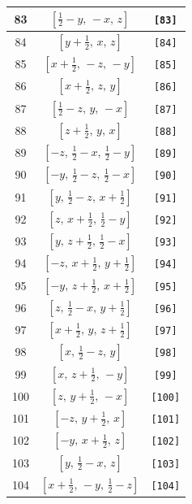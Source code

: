 \documentclass[fleqn,8pt]{jsarticle}
\begin{document}
\begin{longtable}{ccc}
83 & $\left[ \frac{1}{2} - y,\, - x,\, z \right]$ & {\tt [83]} \\ \hline
84 & $\left[ y + \frac{1}{2},\, x,\, z \right]$ & {\tt [84]} \\ \hline
85 & $\left[ x + \frac{1}{2},\, - z,\, - y \right]$ & {\tt [85]} \\ \hline
86 & $\left[ x + \frac{1}{2},\, z,\, y \right]$ & {\tt [86]} \\ \hline
87 & $\left[ \frac{1}{2} - z,\, y,\, - x \right]$ & {\tt [87]} \\ \hline
88 & $\left[ z + \frac{1}{2},\, y,\, x \right]$ & {\tt [88]} \\ \hline
89 & $\left[ - z,\, \frac{1}{2} - x,\, \frac{1}{2} - y \right]$ & {\tt [89]} \\ \hline
90 & $\left[ - y,\, \frac{1}{2} - z,\, \frac{1}{2} - x \right]$ & {\tt [90]} \\ \hline
91 & $\left[ y,\, \frac{1}{2} - z,\, x + \frac{1}{2} \right]$ & {\tt [91]} \\ \hline
92 & $\left[ z,\, x + \frac{1}{2},\, \frac{1}{2} - y \right]$ & {\tt [92]} \\ \hline
93 & $\left[ y,\, z + \frac{1}{2},\, \frac{1}{2} - x \right]$ & {\tt [93]} \\ \hline
94 & $\left[ - z,\, x + \frac{1}{2},\, y + \frac{1}{2} \right]$ & {\tt [94]} \\ \hline
95 & $\left[ - y,\, z + \frac{1}{2},\, x + \frac{1}{2} \right]$ & {\tt [95]} \\ \hline
96 & $\left[ z,\, \frac{1}{2} - x,\, y + \frac{1}{2} \right]$ & {\tt [96]} \\ \hline
97 & $\left[ x + \frac{1}{2},\, y,\, z + \frac{1}{2} \right]$ & {\tt [97]} \\ \hline
98 & $\left[ x,\, \frac{1}{2} - z,\, y \right]$ & {\tt [98]} \\ \hline
99 & $\left[ x,\, z + \frac{1}{2},\, - y \right]$ & {\tt [99]} \\ \hline
100 & $\left[ z,\, y + \frac{1}{2},\, - x \right]$ & {\tt [100]} \\ \hline
101 & $\left[ - z,\, y + \frac{1}{2},\, x \right]$ & {\tt [101]} \\ \hline
102 & $\left[ - y,\, x + \frac{1}{2},\, z \right]$ & {\tt [102]} \\ \hline
103 & $\left[ y,\, \frac{1}{2} - x,\, z \right]$ & {\tt [103]} \\ \hline
104 & $\left[ x + \frac{1}{2},\, - y,\, \frac{1}{2} - z \right]$ & {\tt [104]} \\ \hline

\end{longtable}
\end{document}
